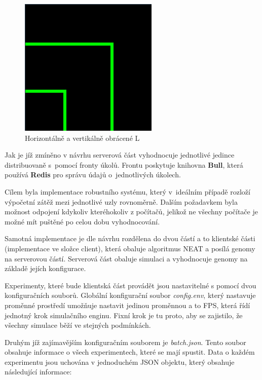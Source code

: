 \begin{figure}[H]
	\centering
	\includegraphics[scale=0.6]{pieces/inverted_upside_L}
	\caption{Horizontálně a vertikálně obrácené L}
	\label{fig:invertedupsidel}
\end{figure}



Jak je jíž zmíněno v návrhu serverová část vyhodnocuje jednotlivé jedince distribuovaně s~pomocí fronty úkolů. Frontu poskytuje knihovna \textbf{Bull}, která používá \textbf{Redis} pro správu údajů o~jednotlivých úkolech. 

Cílem byla implementace robustního systému, který v~ideálním případě rozloží výpočetní zátěž mezi jednotlivé uzly rovnoměrně. Dalším požadavkem byla možnost odpojení kdykoliv kteréhokoliv z počítačů, jelikož ne všechny počítače je možné mít puštěné po celou dobu vyhodnocování.

Samotná implementace je dle návrhu rozdělena do dvou částí a to klientské části (implementace ve složce client), která obaluje algoritmus NEAT a posílá genomy na serverovou částí. Serverová část obaluje simulaci a vyhodnocuje genomy na základě jejích konfigurace.

Experimenty, které bude klientská část provádět jsou nastavitelné s pomocí dvou konfiguračních souborů.
Globální konfigurační soubor \emph{config.env}, který nastavuje proměnné prostředí umožňuje nastavit jedinou proměnnou a to FPS, která řídí jednotný krok simulačního enginu. Fixní krok je tu proto, aby se zajistilo, že všechny simulace běží ve stejných podmínkách.

Druhým jíž zajímavějším konfiguračním souborem je \emph{batch.json}. Tento soubor obsahuje informace o všech experimentech, které se mají spustit. Data o každém experimentu jsou uchována v jednoduchém JSON objektu, který obsahuje následující informace:

